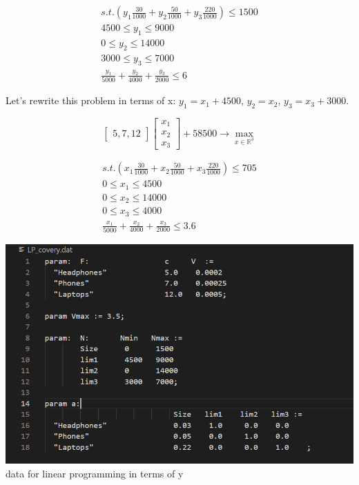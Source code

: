 \begin{equation*}
    \begin{gathered}
        s.t. \left(y_1 \frac{30}{1000} + y_2 \frac{50}{1000} + y_3 \frac{220}{1000} \right) \leq 1500 \\
        4500 \leq y_1 \leq 9000 \\
        0 \leq y_2 \leq 14000 \\
        3000 \leq y_3 \leq 7000 \\
        \frac{y_1}{5000} + \frac{y_2}{4000} + \frac{y_3}{2000} \leq 6
    \end{gathered}
\end{equation*}

Let's rewrite this problem in terms of x: $y_1 = x_1 + 4500$, $y_2 = x_2$, $y_3 = x_3 + 3000$.

\begin{equation*}
    \begin{bmatrix} 5, 7, 12 \end{bmatrix} 
    \begin{bmatrix}
    x_1 \\
    x_2 \\
    x_3
    \end{bmatrix} + 58500 \rightarrow \max_{x \in \mathds{R}^3}
\end{equation*}


\begin{equation*}
    \begin{gathered}
        s.t. \left(x_1 \frac{30}{1000} + x_2 \frac{50}{1000} + x_3 \frac{220}{1000} \right) \leq 705 \\
        0 \leq x_1 \leq 4500 \\
        0 \leq x_2 \leq 14000 \\
        0 \leq x_3 \leq 4000 \\
        \frac{x_1}{5000} + \frac{x_2}{4000} + \frac{x_3}{2000} \leq 3.6
    \end{gathered}
\end{equation*}


\begin{center}
    \includegraphics[scale=0.6]{pictures/task_11_ydat.png} \\
    data for linear programming in terms of y
\end{center}

